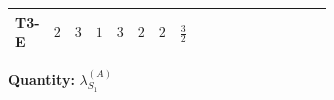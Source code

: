\documentclass[8pt]{article}
\begin{document}
\begin{landscape}
\begin{longtable}{@{}llcccccc >{\raggedright\arraybackslash}p{0.21\linewidth} >{\raggedright\arraybackslash}p{0.21\linewidth} >{\raggedright\arraybackslash}p{0.21\linewidth}@{}}
T3-E & $2$ & $3$ & $1$ & $3$ & $2$ & $2$ & $\frac{3}{2}$ & \scriptsize\adjustbox{max width=\linewidth}{$\begin{gathered} {\lambda_{S_1}^{(1)}} \left(\frac{1}{2} T_{\nu}^{(1)}+13 {\lambda_{S_1}^{(A)}}\right)\end{gathered}$} & \scriptsize\adjustbox{max width=\linewidth}{$\begin{gathered} +4 {\lambda_{S_1}^{(A)}} T_{\nu}^{(1)}\end{gathered}$} & \scriptsize\adjustbox{max width=\linewidth}{$\begin{gathered} -\operatorname{Tr}\!\left({y_1}\,\left({y_1}\right)^{\dagger}\,{y_1}\,\left({y_1}\right)^{\dagger}\right)\end{gathered}$} \\
\midrule
\bottomrule
\end{longtable}
\clearpage
\noindent\textbf{Quantity: }$\lambda_{S_1}^{(A)}$\par\smallskip

\end{landscape}
\end{document}
